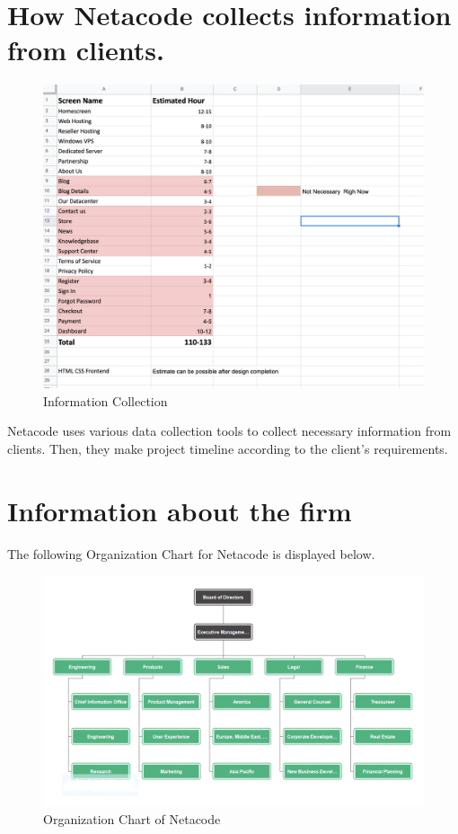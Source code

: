 \documentclass[a4paper,12pt]{report}
\begin{document}
\section{How Netacode collects information from clients.}
\begin{figure}[h]
	\centering
	\includegraphics[width=0.7\linewidth]{5_1}
	\caption{Information Collection}
	\label{fig:51}
\end{figure}
Netacode uses various data collection tools to collect necessary information from clients. Then, they make project timeline according to the client's requirements. 
\section{Information about the firm}
The following Organization Chart for Netacode is displayed below.
\newpage
\begin{figure}[h]
	\centering
	\includegraphics[width=0.9\linewidth]{5_2}
	\caption{Organization Chart of Netacode}
	\label{fig:52}
\end{figure}
\end{document}
